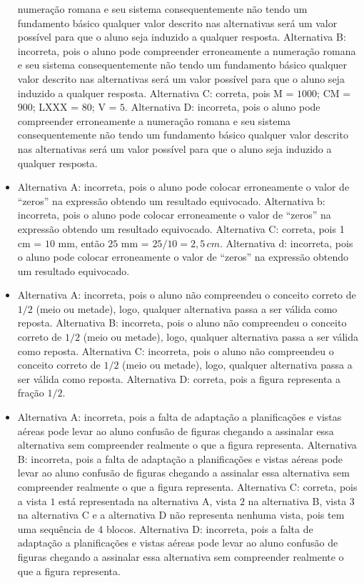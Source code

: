 \begin{itemize}
numeração romana e seu sistema consequentemente não tendo um fundamento
básico qualquer valor descrito nas alternativas será um valor possível
para que o aluno seja induzido a qualquer resposta.
Alternativa B: incorreta, pois o aluno pode compreender erroneamente a
numeração romana e seu sistema consequentemente não tendo um fundamento
básico qualquer valor descrito nas alternativas será um valor possível
para que o aluno seja induzido a qualquer resposta.
Alternativa C: correta, pois M = $1000$; CM = $900$; LXXX = $80$; V = $5$.
Alternativa D: incorreta, pois o aluno pode compreender erroneamente a
numeração romana e seu sistema consequentemente não tendo um fundamento
básico qualquer valor descrito nas alternativas será um valor possível
para que o aluno seja induzido a qualquer resposta.
\item Alternativa A: incorreta, pois o aluno pode colocar erroneamente o valor
de ``zeros'' na expressão obtendo um resultado equivocado.
Alternativa b: incorreta, pois o aluno pode colocar erroneamente o valor
de ``zeros'' na expressão obtendo um resultado equivocado.
Alternativa C: correta, pois 1 cm = $10$ mm, então $25$ mm = $25 / 10 = 2,5\,cm$.
Alternativa d: incorreta, pois o aluno pode colocar erroneamente o valor
de ``zeros'' na expressão obtendo um resultado equivocado.
\item Alternativa A: incorreta, pois o aluno não compreendeu o conceito
correto de $1/2$ (meio ou metade), logo, qualquer alternativa passa a ser
válida como reposta.
Alternativa B: incorreta, pois o aluno não compreendeu o conceito
correto de $1/2$ (meio ou metade), logo, qualquer alternativa passa a ser
válida como reposta.
Alternativa C: incorreta, pois o aluno não compreendeu o conceito
correto de $1/2$ (meio ou metade), logo, qualquer alternativa passa a ser
válida como reposta.
Alternativa D: correta, pois a figura representa a fração $1/2$.
\item Alternativa A: incorreta, pois a falta de adaptação a planificações e
vistas aéreas pode levar ao aluno confusão de figuras chegando a
assinalar essa alternativa sem compreender realmente o que a figura
representa.
Alternativa B: incorreta, pois a falta de adaptação a planificações e
vistas aéreas pode levar ao aluno confusão de figuras chegando a
assinalar essa alternativa sem compreender realmente o que a figura
representa.
Alternativa C: correta, pois a vista $1$ está representada na alternativa
A, vista $2$ na alternativa B, vista $3$ na alternativa C e a alternativa D
não representa nenhuma vista, pois tem uma sequência de $4$ blocos.
Alternativa D: incorreta, pois a falta de adaptação a planificações e
vistas aéreas pode levar ao aluno confusão de figuras chegando a
assinalar essa alternativa sem compreender realmente o que a figura
representa.
\end{itemize}

